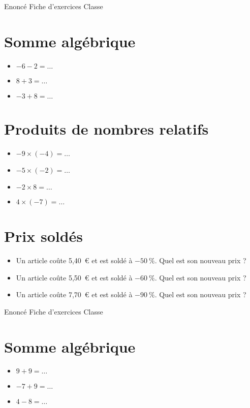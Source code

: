 \documentclass[a4paper,11pt,fleqn]{article}
\begin{document}
\pagestyle{empty}


{Enoncé} \hfill {\huge Fiche d'exercices } \hfill {Classe}

\section{Somme algébrique}
\begin{itemize}

  \item $-6 -2=\ldots$
  \item $8 +3=\ldots$
  \item $-3 +8=\ldots$
\end{itemize}


\section{Produits de nombres relatifs}
\begin{itemize}

  \item $-9\times(-4)=\ldots$
  \item $-5\times(-2)=\ldots$
  \item $-2\times8=\ldots$
  \item $4\times(-7)=\ldots$
\end{itemize}


\section{Prix soldés}
\begin{itemize}

  \item Un article coûte 5,40~€ et est soldé à $-50~\%$. Quel est son nouveau prix ?
  \item Un article coûte 5,50~€ et est soldé à $-60~\%$. Quel est son nouveau prix ?
  \item Un article coûte 7,70~€ et est soldé à $-90~\%$. Quel est son nouveau prix ?
\end{itemize}
\newpage
\setcounter{exo}{0}
\setcounter{section}{0}
{Enoncé} \hfill {\huge Fiche d'exercices } \hfill {Classe}

\section{Somme algébrique}
\begin{itemize}

  \item $9 +9=\ldots$
  \item $-7 +9=\ldots$
  \item $4 -8=\ldots$
\end{itemize}
\end{document}
